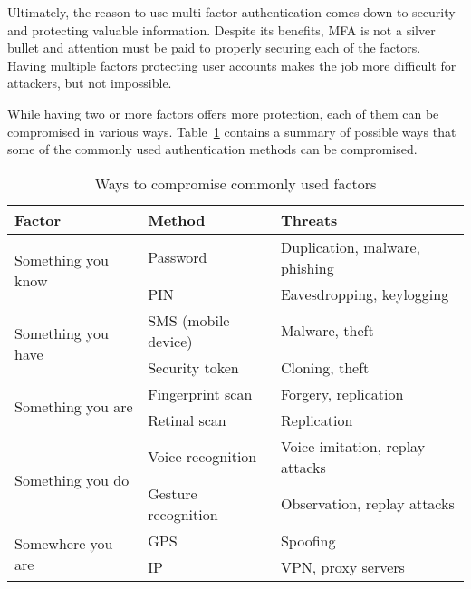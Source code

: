 Ultimately, the reason to use multi-factor authentication comes down to security and protecting valuable information. Despite its benefits, MFA is not a silver bullet and attention must be paid to properly securing each of the factors. Having multiple factors protecting user accounts makes the job more difficult for attackers, but not impossible.

While having two or more factors offers more protection, each of them can be compromised in various ways. Table~\ref{tab:vulnerabilities} contains a summary of possible ways that some of the commonly used authentication methods can be compromised.

\begin{table}[ht]
    \centering
    \renewcommand{\arraystretch}{1.4}
    \begin{tabular}{l | l | l}
        \textbf{Factor}                     & \textbf{Method}     & \textbf{Threats}                \\
        \hline
        \multirow{2}{*}{Something you know} & Password            & Duplication, malware, phishing  \\
        \cline{2-3}                         & PIN                 & Eavesdropping, keylogging       \\
        \hline
        \multirow{2}{*}{Something you have} & SMS (mobile device) & Malware, theft                  \\
        \cline{2-3}                         & Security token      & Cloning, theft                  \\
        \hline
        \multirow{2}{*}{Something you are}  & Fingerprint scan    & Forgery, replication            \\
        \cline{2-3}                         & Retinal scan        & Replication                     \\
        \hline
        \multirow{2}{*}{Something you do}   & Voice recognition   & Voice imitation, replay attacks \\
        \cline{2-3}                         & Gesture recognition & Observation, replay attacks     \\
        \hline
        \multirow{2}{*}{Somewhere you are}  & GPS                 & Spoofing                        \\
        \cline{2-3}                         & IP                  & VPN, proxy servers              \\
    \end{tabular}
    \caption{Ways to compromise commonly used factors \citep[41--45]{grassi_digital_2017}}
    \label{tab:vulnerabilities}
\end{table}

